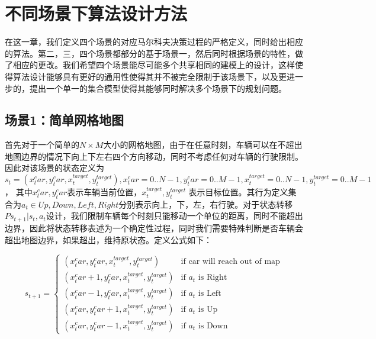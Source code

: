 \documentclass{standalone}
\begin{document}
\section{不同场景下算法设计方法}
在这一章，我们定义四个场景的对应马尔科夫决策过程的严格定义，同时给出相应的算法。第二，三，四个场景都部分的基于场景一，然后同时根据场景的特性，做了相应的更改。我们希望四个场景能尽可能多个共享相同的建模上的设计，这样使得算法设计能够具有更好的通用性使得其并不被完全限制于该场景下，以及更进一步的，提出一个单一的集合模型使得其能够同时解决多个场景下的规划问题。
\subsection{场景1：简单网格地图}
首先对于一个简单的$N \times M$大小的网格地图，由于在任意时刻，车辆可以在不超出地图边界的情况下向上下左右四个方向移动，同时不考虑任何对车辆的行驶限制。因此对该场景的状态定义为$s_t = (x_t^car, y_t^car, x^{target}_t, y^{target}_t), x_t^car=0..N-1, y_t^car=0..M-1, x^{target}_t=0..N-1, y^{target}_t=0..M-1$， 其中$x_t^car, y_t^car$表示车辆当前位置，$x^{target}_t, y^{target}_t$ 表示目标位置。其行为定义集合为$a_t \in {Up, Down, Left, Right}$分别表示向上，下，左，右行驶。对于状态转移$P{s_{t+1}|s_t, a_t}$设计，我们限制车辆每个时刻只能移动一个单位的距离，同时不能超出边界，因此将状态转移表述为一个确定性过程，同时我们需要特殊判断是否车辆会超出地图边界，如果超出，维持原状态。定义公式如下：
\begin{center}
    \begin{equation}
    s_{t+1} = \begin{cases}
    (x_t^car, y_t^car, x^{target}_t, y^{target}_t) &\mbox{if car will reach out of map}\\
    (x_t^car + 1, y_t^car, x^{target}_t, y^{target}_t) &\mbox{if $a_t$ is Right}\\
    (x_t^car - 1, y_t^car, x^{target}_t, y^{target}_t) &\mbox{if $a_t$ is Left}\\
    (x_t^car, y_t^car + 1, x^{target}_t, y^{target}_t) &\mbox{if $a_t$ is Up}\\
    (x_t^car, y_t^car - 1, x^{target}_t, y^{target}_t) &\mbox{if $a_t$ is Down}
    \end{cases}
\end{equation}
\end{center}
\end{document}
